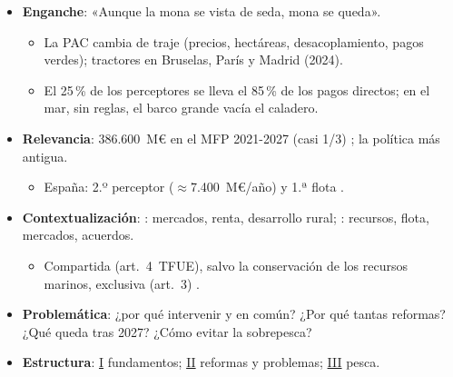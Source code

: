 \documentclass{article}
\begin{document}
\cabecerarepaso
\begin{columnas}

\begin{itemize}
\item \textbf{Enganche}: «Aunque la mona se vista de seda, mona se queda».
  \begin{itemize}
  \item La PAC cambia de traje (precios, hectáreas, desacoplamiento, pagos verdes); tractores en Bruselas, París y Madrid (2024).
  \item El 25\,\% de los perceptores se lleva el 85\,\% de los pagos directos; en el mar, sin reglas, el barco grande vacía el caladero.
  \end{itemize}
\item \textbf{Relevancia}: 386.600~M€ en el MFP 2021-2027 (casi 1/3) ; la política más antigua.
  \begin{itemize}
  \item España: 2.º perceptor ($\approx$7.400~M€/año) y 1.ª flota .
  \end{itemize}
\item \textbf{Contextualización}: : mercados, renta, desarrollo rural; : recursos, flota, mercados, acuerdos.
  \begin{itemize}
  \item Compartida (art.~4~TFUE), salvo la conservación de los recursos marinos, exclusiva (art.~3) .
  \end{itemize}
\item \textbf{Problemática}: ¿por qué intervenir y en común? ¿Por qué tantas reformas? ¿Qué queda tras 2027? ¿Cómo evitar la sobrepesca?
\item \textbf{Estructura}: \hyperref[rep:I]{I} fundamentos; \hyperref[rep:II]{II} reformas y problemas; \hyperref[rep:III]{III} pesca.
\end{itemize}


\end{columnas}
\end{document}

